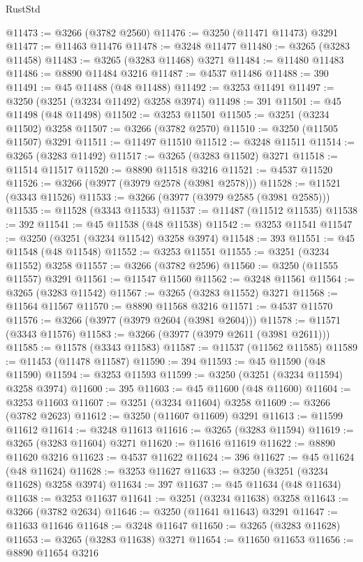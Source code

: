 \begin{lexlean}{RustStd}
\begin{coremodule}
@11473 := @3266 (@3782 @2560)
@11476 := @3250 (@11471 @11473) @3291
@11477 := @11463 @11476
@11478 := @3248 @11477
@11480 := @3265 (@3283 @11458)
@11483 := @3265 (@3283 @11468) @3271
@11484 := @11480 @11483
@11486 := @8890 @11484 @3216
@11487 := @4537 @11486
@11488 := 390
@11491 := @45 @11488 (@48 @11488)
@11492 := @3253 @11491
@11497 := @3250 (@3251 (@3234 @11492) @3258 @3974)
@11498 := 391
@11501 := @45 @11498 (@48 @11498)
@11502 := @3253 @11501
@11505 := @3251 (@3234 @11502) @3258
@11507 := @3266 (@3782 @2570)
@11510 := @3250 (@11505 @11507) @3291
@11511 := @11497 @11510
@11512 := @3248 @11511
@11514 := @3265 (@3283 @11492)
@11517 := @3265 (@3283 @11502) @3271
@11518 := @11514 @11517
@11520 := @8890 @11518 @3216
@11521 := @4537 @11520
@11526 := @3266 (@3977 (@3979 @2578 (@3981 @2578)))
@11528 := @11521 (@3343 @11526)
@11533 := @3266 (@3977 (@3979 @2585 (@3981 @2585)))
@11535 := @11528 (@3343 @11533)
@11537 := @11487 (@11512 @11535)
@11538 := 392
@11541 := @45 @11538 (@48 @11538)
@11542 := @3253 @11541
@11547 := @3250 (@3251 (@3234 @11542) @3258 @3974)
@11548 := 393
@11551 := @45 @11548 (@48 @11548)
@11552 := @3253 @11551
@11555 := @3251 (@3234 @11552) @3258
@11557 := @3266 (@3782 @2596)
@11560 := @3250 (@11555 @11557) @3291
@11561 := @11547 @11560
@11562 := @3248 @11561
@11564 := @3265 (@3283 @11542)
@11567 := @3265 (@3283 @11552) @3271
@11568 := @11564 @11567
@11570 := @8890 @11568 @3216
@11571 := @4537 @11570
@11576 := @3266 (@3977 (@3979 @2604 (@3981 @2604)))
@11578 := @11571 (@3343 @11576)
@11583 := @3266 (@3977 (@3979 @2611 (@3981 @2611)))
@11585 := @11578 (@3343 @11583)
@11587 := @11537 (@11562 @11585)
@11589 := @11453 (@11478 @11587)
@11590 := 394
@11593 := @45 @11590 (@48 @11590)
@11594 := @3253 @11593
@11599 := @3250 (@3251 (@3234 @11594) @3258 @3974)
@11600 := 395
@11603 := @45 @11600 (@48 @11600)
@11604 := @3253 @11603
@11607 := @3251 (@3234 @11604) @3258
@11609 := @3266 (@3782 @2623)
@11612 := @3250 (@11607 @11609) @3291
@11613 := @11599 @11612
@11614 := @3248 @11613
@11616 := @3265 (@3283 @11594)
@11619 := @3265 (@3283 @11604) @3271
@11620 := @11616 @11619
@11622 := @8890 @11620 @3216
@11623 := @4537 @11622
@11624 := 396
@11627 := @45 @11624 (@48 @11624)
@11628 := @3253 @11627
@11633 := @3250 (@3251 (@3234 @11628) @3258 @3974)
@11634 := 397
@11637 := @45 @11634 (@48 @11634)
@11638 := @3253 @11637
@11641 := @3251 (@3234 @11638) @3258
@11643 := @3266 (@3782 @2634)
@11646 := @3250 (@11641 @11643) @3291
@11647 := @11633 @11646
@11648 := @3248 @11647
@11650 := @3265 (@3283 @11628)
@11653 := @3265 (@3283 @11638) @3271
@11654 := @11650 @11653
@11656 := @8890 @11654 @3216

\end{coremodule}
\end{lexlean}
